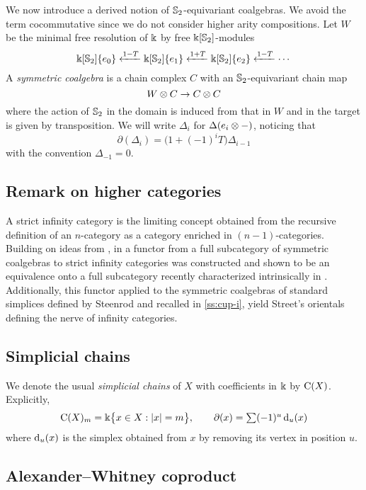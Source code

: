 We now introduce a derived notion of $\Sym_2$-equivariant coalgebras.
We avoid the term cocommutative since we do not consider higher arity compositions.
Let $W$ be the minimal free resolution of $\k$ by free $\k[\Sym_2]$-modules
\[
\k[\Sym_2]\set{e_0} \xla{1-T} \k[\Sym_2]\set{e_1} \xla{1+T} \k[\Sym_2]\set{e_2} \xla{1-T} \dotsb
\]
A \textit{symmetric coalgebra} is a chain complex $C$ with an $\Sym_2$-equivariant chain map
\[
W \ot C \to C \ot C
\]
where the action of $\Sym_2$ in the domain is induced from that in $W$ and in the target is given by transposition.
We will write $\Delta_i$ for $\Delta(e_i \ot -)$, noticing that
\[
\partial(\Delta_i) = \big( 1+(-1)^i T \big) \Delta_{i-1}
\]
with the convention $\Delta_{-1} = 0$.

\subsection{Remark on higher categories}
\label{ss:higher categories}

A strict infinity category is the limiting concept obtained from the recursive definition of an $n$-category as a category enriched in $(n-1)$-categories.
Building on ideas from \cite{brown1981cubes, kapranov1991polycategory, steiner2004omega}, in \cite{medina2020globular} a functor from a full subcategory of symmetric coalgebras to strict infinity categories was constructed and shown to be an equivalence onto a full subcategory recently characterized intrinsically in \cite{ozornova2022steiner}.
Additionally, this functor applied to the symmetric coalgebras of standard simplices defined by Steenrod and recalled in \cref{ss:cup-i}, yield Street's orientals \cite{street1987orientals} defining the nerve of infinity categories.

\subsection{Simplicial chains}

We denote the usual \textit{simplicial chains} of $X$ with coefficients in $\k$ by $\chains(X)$.
Explicitly,
\[
\chains(X)_m = \k\set[\big]{x \in X : \bars{x} = m},
\qquad \partial(x) = \textstyle\sum (-1)^u \face_u(x)
\]
where $\face_u(x)$ is the simplex obtained from $x$ by removing its vertex in position $u$.


\subsection{Alexander--Whitney coproduct} \label{ss:aw diagonal}

